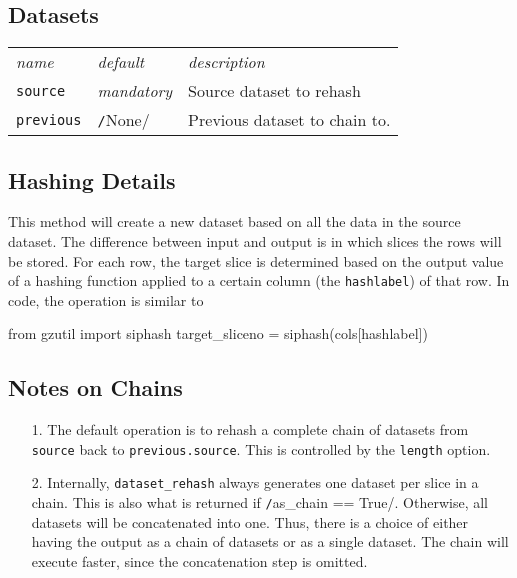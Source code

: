 \subsection*{Datasets}
\begin{tabular}{ p{3.2cm} p{1.8cm} p{10cm}}\hline
  \textsl{name} & \textsl{default} & \textsl{description}\\[2ex]
  \texttt{source} & \textsl{mandatory} & Source dataset to rehash\\[1ex]
  \texttt{previous} & \texttt/None/ & Previous dataset to chain  to.\\[1ex]
  \hline
\end{tabular}








\subsection{Hashing Details}
This method will create a new dataset based on all the data in the
source dataset.  The difference between input and output is in which
slices the rows will be stored.  For each row, the target slice is
determined based on the output value of a hashing function applied to
a certain column (the \texttt{hashlabel}) of that row.  In code, the
operation is similar to
\begin{python}
    from gzutil import siphash
    target_sliceno = siphash(cols[hashlabel]) %
\end{python}

\subsection{Notes on Chains}

\begin{enumerate}
  \item[1.]  The default operation is to rehash a complete chain of
    datasets from \texttt{source} back to \texttt{previous.source}.
    This is controlled by the \texttt{length} option.

  \item[2.]  Internally, \texttt{dataset\_rehash} always generates one
    dataset per slice in a chain.  This is also what is returned if
    \texttt/as\_chain == True/.  Otherwise, all datasets
    will be concatenated into one.  Thus, there is a choice of either
    having the output as a chain of datasets or as a single dataset.
    The chain will execute faster, since the concatenation step is
    omitted.
\end{enumerate}

